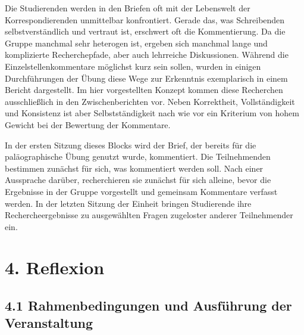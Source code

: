 \documentclass[
          a4paper,
        ]{article}
\begin{document}
Die Studierenden werden in den Briefen oft mit der Lebenswelt der
Korrespondierenden unmittelbar konfrontiert. Gerade das, was
Schreibenden selbstverständlich und vertraut ist, erschwert oft die
Kommentierung. Da die Gruppe manchmal sehr heterogen ist, ergeben sich
manchmal lange und komplizierte Recherchepfade, aber auch lehrreiche
Diskussionen. Während die Einzelstellenkommentare möglichst kurz sein
sollen, wurden in einigen Durchführungen der Übung diese Wege zur
Erkenntnis exemplarisch in einem Bericht dargestellt. Im hier
vorgestellten Konzept kommen diese Recherchen ausschließlich in den
Zwischenberichten vor. Neben Korrektheit, Vollständigkeit und Konsistenz
ist aber Selbstständigkeit nach wie vor ein Kriterium von hohem Gewicht
bei der Bewertung der Kommentare.

In der ersten Sitzung dieses Blocks wird der Brief, der bereits für die
paläographische Übung genutzt wurde, kommentiert. Die Teilnehmenden
bestimmen zunächst für sich, was kommentiert werden soll. Nach einer
Aussprache darüber, recherchieren sie zunächst für sich alleine, bevor
die Ergebnisse in der Gruppe vorgestellt und gemeinsam Kommentare
verfasst werden. In der letzten Sitzung der Einheit bringen Studierende
ihre Rechercheergebnisse zu ausgewählten Fragen zugeloster anderer
Teilnehmender ein.

\section{4. Reflexion}\label{reflexion}

\subsection{4.1 Rahmenbedingungen und Ausführung der
Veranstaltung}\label{rahmenbedingungen-und-ausfuxfchrung-der-veranstaltung}
\end{document}
